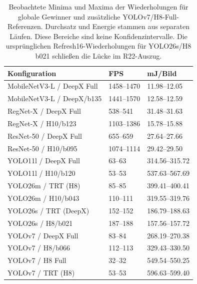 \begin{table}[t]
\centering
\caption{Beobachtete Minima und Maxima der Wiederholungen für globale Gewinner und zusätzliche YOLOv7/H8-Full-Referenzen. Durchsatz und Energie stammen aus separaten Läufen. Diese Bereiche sind keine Konfidenzintervalle. Die ursprünglichen Refresh16-Wiederholungen für YOLO26s/H8 b021 schließen die Lücke im R22-Auszug.}
\label{tab:winner-repeat-ranges}
\begingroup\small\setlength{\tabcolsep}{3pt}
\begin{tabular*}{\columnwidth}{@{\extracolsep{\fill}}l l l@{}}
\toprule
Konfiguration & FPS & mJ/Bild \\
\midrule
MobileNetV3-L / DeepX Full & 1458--1470 & 11.98--12.05 \\
MobileNetV3-L / DeepX/b135 & 1441--1570 & 12.58--12.59 \\
RegNet-X / DeepX Full & 538--541 & 31.48--31.63 \\
RegNet-X / H10/b123 & 1103--1386 & 15.78--15.88 \\
ResNet-50 / DeepX Full & 655--659 & 27.64--27.66 \\
ResNet-50 / H10/b095 & 1074--1114 & 29.42--29.50 \\
YOLO11l / DeepX Full & 63--63 & 314.56--315.72 \\
YOLO11l / H10/b120 & 53--53 & 537.63--567.69 \\
YOLO26m / TRT (H8) & 85--85 & 399.41--400.41 \\
YOLO26m / H10/b043 & 110--111 & 319.55--319.76 \\
YOLO26s / TRT (DeepX) & 152--152 & 186.79--188.63 \\
YOLO26s / H8/b021 & 187--188 & 157.56--157.72 \\
YOLOv7 / DeepX Full & 83--84 & 268.19--270.38 \\
YOLOv7 / H8/b066 & 112--113 & 329.43--330.50 \\
YOLOv7 / H8 Full & 32--32 & 549.54--550.25 \\
YOLOv7 / TRT (H8) & 53--53 & 596.63--599.40 \\
\bottomrule
\end{tabular*}
\endgroup
\end{table}
